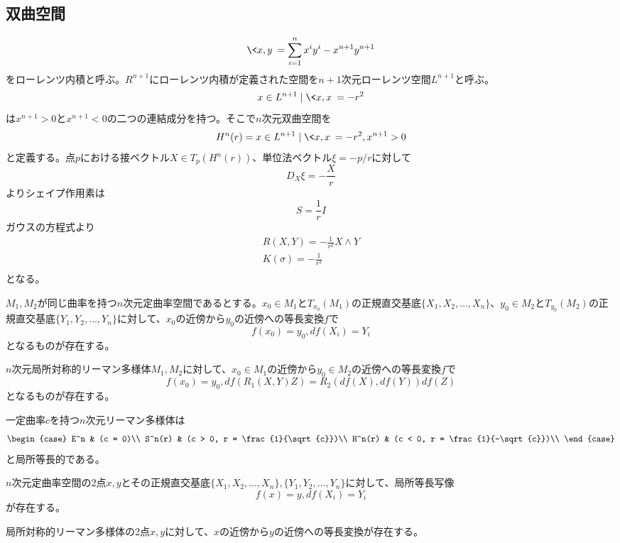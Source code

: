     \subsection{双曲空間}
            \[\<x, y\> = \sum_{i=1}^n x^iy^i - x^{n+1}y^{n+1}\]
        をローレンツ内積と呼ぶ。$R^{n+1}$にローレンツ内積が定義された空間を$n+1$次元ローレンツ空間$L^{n+1}$と呼ぶ。
            \[{x \in L^{n+1} \mid \<x, x\> = -r^2}\]
        は$x^{n+1} > 0$と$x^{n+1} < 0$の二つの連結成分を持つ。そこで$n$次元双曲空間を
            \[H^n(r) = {x \in L^{n+1} \mid \<x, x\> = -r^2, x^{n+1} > 0}\]
        と定義する。点$p$における接ベクトル$X \in T_p(H^n(r))$、単位法ベクトル$\xi = -p/r$に対して
            \[D_X\xi = -\frac{X}{r}\]
        よりシェイプ作用素は
            \[S = \frac{1}{r}I\]
        ガウスの方程式より
        \begin{align*}
            R(X, Y) = -\frac{1}{r^2}X \wedge Y\\
            K(\sigma) = -\frac{1}{r^2}\\
        \end{align*}
        となる。

    \begin{thm}
        $M_1, M_2$が同じ曲率を持つ$n$次元定曲率空間であるとする。$x_0 \in M_1$と$T_{x_0}(M_1)$の正規直交基底$\{X_1, X_2, \dots, X_n\}$、$y_0 \in M_2$と$T_{y_0}(M_2)$の正規直交基底$\{Y_1, Y_2, \dots, Y_n\}$に対して、$x_0$の近傍から$y_0$の近傍への等長変換$f$で
            \[f(x_0) = y_0, df(X_i) = Y_i\]
        となるものが存在する。
    \end{thm}
    \begin{thm}
        $n$次元局所対称的リーマン多様体$M_1, M_2$に対して、$x_0 \in M_1$の近傍から$y_0 \in M_2$の近傍への等長変換$f$で
            \[f(x_0) = y_0, df(R_1(X, Y)Z) = R_2(df(X), df(Y))df(Z)\]
        となるものが存在する。
    \end{thm}
    \begin{cor}
        一定曲率$c$を持つ$n$次元リーマン多様体は
        \[\begin{case}
            E^n & (c = 0)\\
            S^n(r) & (c > 0, r = \frac{1}{\sqrt{c}})\\
            H^n(r) & (c < 0, r = \frac{1}{-\sqrt{c}})\\
        \end{case}\]
        と局所等長的である。
    \end{cor}
    \begin{cor}
        $n$次元定曲率空間の2点$x, y$とその正規直交基底$\{X_1, X_2, \dots, X_n\}, \{Y_1, Y_2, \dots, Y_n\}$に対して、局所等長写像
            \[f(x) = y, df(X_i) = Y_i\]
        が存在する。
    \end{cor}
    \begin{cor}
        局所対称的リーマン多様体の2点$x, y$に対して、$x$の近傍から$y$の近傍への等長変換が存在する。
    \end{cor}